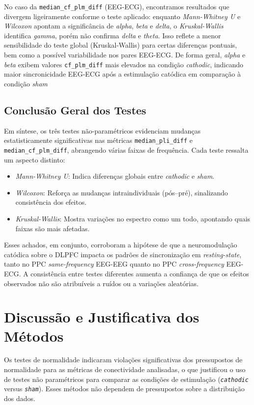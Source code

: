 No caso da \texttt{median\_cf\_plm\_diff} (EEG-ECG), encontramos resultados que divergem ligeiramente conforme o teste aplicado: enquanto \emph{Mann-Whitney U} e \emph{Wilcoxon} apontam a significância de \textit{alpha}, \textit{beta} e \textit{delta}, o \emph{Kruskal-Wallis} identifica \textit{gamma}, porém não confirma \textit{delta} e \textit{theta}. Isso reflete a menor sensibilidade do teste global (Kruskal-Wallis) para certas diferenças pontuais, bem como a possível variabilidade nos pares EEG-ECG. De forma geral, \textit{alpha} e \textit{beta} exibem valores \texttt{cf\_plm\_diff} mais elevados na condição \textit{cathodic}, indicando maior sincronicidade EEG-ECG após a estimulação catódica em comparação à condição \textit{sham}


\subsection{Conclusão Geral dos Testes}
Em síntese, os três testes não-paramétricos evidenciam mudanças estatisticamente significativas nas métricas \texttt{median\_pli\_diff} e \texttt{median\_cf\_plm\_diff}, abrangendo várias faixas de frequência. Cada teste ressalta um aspecto distinto:
\begin{itemize}
    \item \emph{Mann-Whitney U}: Indica diferenças globais entre \textit{cathodic} e \textit{sham}.
    \item \emph{Wilcoxon}: Reforça as mudanças intraindividuais (pós--pré), sinalizando consistência dos efeitos.
    \item \emph{Kruskal-Wallis}: Mostra variações no espectro como um todo, apontando quais faixas são mais afetadas.
\end{itemize}

Esses achados, em conjunto, corroboram a hipótese de que a neuromodulação catódica sobre o DLPFC impacta os padrões de sincronização em \textit{resting-state}, tanto no PPC \textit{same-frequency} EEG-EEG quanto no PPC \textit{cross-frequency} EEG-ECG. A consistência entre testes diferentes aumenta a confiança de que os efeitos observados não são atribuíveis a ruídos ou a variações aleatórias.

\section{Discussão e Justificativa dos Métodos}
Os testes de normalidade indicaram violações significativas dos pressupostos de normalidade para as métricas de conectividade analisadas, o que justificou o uso de testes não paramétricos para comparar as condições de estimulação (\texttt{\textit{cathodic}} versus \texttt{\textit{sham}}). Esses métodos não dependem de pressupostos sobre a distribuição dos dados.

